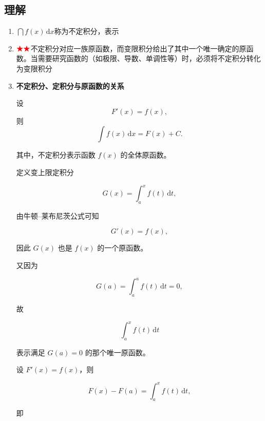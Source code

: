 \documentclass[../book.tex]{subfiles}
\begin{document}
    \subsection{理解}

    \begin{enumerate}
        \item $\dint f(x)\,\mathrm{d}x$称为不定积分，表示{\color{red}{全体原函数}}
        \item $\color{red}{\bigstar}\color{red}{\bigstar}$不定积分对应一族原函数，而变限积分给出了其中一个唯一确定的原函数。当需要研究函数的{\color{性态}}（如极限、导数、单调性等）时，必须将不定积分转化为变限积分
        \item
        \begin{analysisbox}
            \textbf{不定积分、定积分与原函数的关系}

            设
            \[
                F'(x)=f(x),
            \]
            则
            \[
                \int f(x)\,\mathrm{d}x = F(x)+C.
            \]

            其中，不定积分表示函数 \(f(x)\) 的全体原函数。

            \vspace{0.5em}

            定义变上限定积分

            \[
                G(x)=\int_a^x f(t)\,\mathrm{d}t,
            \]

            由牛顿--莱布尼茨公式可知

            \[
                G'(x)=f(x),
            \]

            因此 \(G(x)\) 也是 \(f(x)\) 的一个原函数。

            又因为

            \[
                G(a)=\int_a^a f(t)\,\mathrm{d}t=0,
            \]

            故

            \[
                \boxed{
                    \int_a^x f(t)\,\mathrm{d}t
                }
            \]

            表示满足 \(G(a)=0\) 的那个唯一原函数。

            \vspace{0.5em}

            设 \(F'(x)=f(x)\)，则

            \[
                F(x)-F(a)
                =
                \int_a^x f(t)\,\mathrm{d}t,
            \]

            即


\end{analysisbox}
\end{enumerate}
\end{document}
